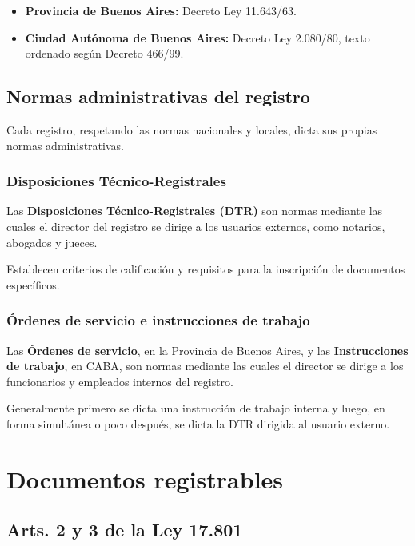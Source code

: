 \documentclass[12pt]{book}
\begin{document}
\begin{itemize}
    \item \textbf{Provincia de Buenos Aires:} Decreto Ley 11.643/63.
    \item \textbf{Ciudad Aut\'onoma de Buenos Aires:} Decreto Ley 2.080/80, texto ordenado seg\'un Decreto 466/99.
\end{itemize}

\subsection{Normas administrativas del registro}

Cada registro, respetando las normas nacionales y locales, dicta sus propias normas administrativas.

\subsubsection{Disposiciones T\'ecnico-Registrales}

Las \textbf{Disposiciones T\'ecnico-Registrales (DTR)} son normas mediante las cuales el director del registro se dirige a los usuarios externos, como notarios, abogados y jueces.

Establecen criterios de calificaci\'on y requisitos para la inscripci\'on de documentos espec\'ificos.

\subsubsection{\'Ordenes de servicio e instrucciones de trabajo}

Las \textbf{\'Ordenes de servicio}, en la Provincia de Buenos Aires, y las \textbf{Instrucciones de trabajo}, en CABA, son normas mediante las cuales el director se dirige a los funcionarios y empleados internos del registro.

Generalmente primero se dicta una instrucci\'on de trabajo interna y luego, en forma simult\'anea o poco despu\'es, se dicta la DTR dirigida al usuario externo.

\section{Documentos registrables}

\subsection{Arts. 2 y 3 de la Ley 17.801}
\end{document}
